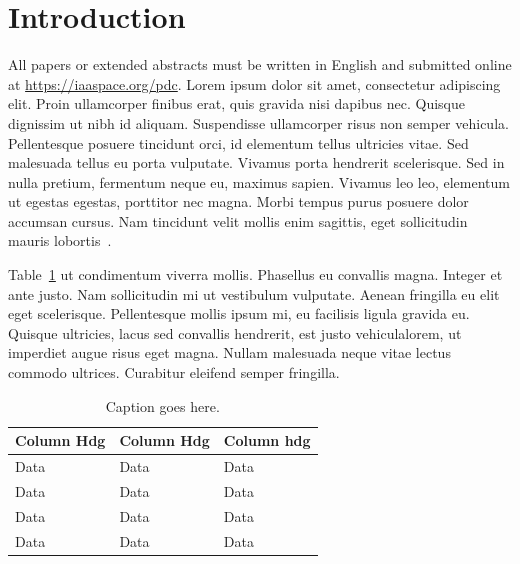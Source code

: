 
\section{Introduction} All papers or extended abstracts must be written in English and submitted online at
\url{https://iaaspace.org/pdc}. Lorem ipsum dolor sit amet, consectetur adipiscing elit. Proin ullamcorper
finibus erat, quis gravida nisi dapibus nec. Quisque dignissim ut nibh id aliquam. Suspendisse
ullamcorper risus non semper vehicula. Pellentesque posuere tincidunt orci, id elementum tellus
ultricies vitae. Sed malesuada tellus eu porta vulputate. Vivamus porta hendrerit scelerisque.
Sed in nulla pretium, fermentum neque eu, maximus sapien. Vivamus leo leo, elementum ut egestas
egestas, porttitor nec magna. Morbi tempus purus posuere dolor accumsan cursus. Nam tincidunt
velit mollis enim sagittis, eget sollicitudin mauris lobortis~\cite{SampleRef1, SampleRef2}.

Table~\ref{tab:tab1} ut condimentum viverra mollis. Phasellus eu convallis magna. Integer et ante justo.
Nam sollicitudin mi ut vestibulum vulputate. Aenean fringilla eu elit eget scelerisque. Pellentesque
mollis ipsum mi, eu facilisis ligula gravida eu. Quisque ultricies, lacus sed convallis hendrerit,
est justo vehiculalorem, ut imperdiet augue risus eget magna. Nullam malesuada neque vitae lectus
commodo ultrices. Curabitur eleifend semper fringilla.  

\begin{table}[h!]
    \centering
    \caption{\small{Caption goes here.}}
    \label{tab:tab1}
    \begin{tabular*}{0.99\columnwidth}{p{1.12in} p{1.12in} p{1.12in}}
        \toprule
        Column Hdg & Column Hdg & Column hdg\\
        \midrule
        Data & Data & Data \\
        Data & Data & Data \\
        Data & Data & Data \\
        Data & Data & Data \\
        \bottomrule
    \end{tabular*}
\end{table}

\endinput

